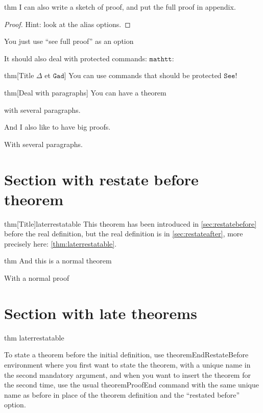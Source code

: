 \documentclass{article}
\begin{document}
\begin{theoremEnd}{thm}
  I can also write a sketch of proof, and put the full proof in appendix.
\end{theoremEnd}
\begin{proof}
  Hint: look at the alias options.
\end{proof}
\begin{proofEnd}
  You just use ``see full proof'' as an option
\end{proofEnd}

It should also deal with protected commands: $\mathtt{mathtt}$:
\begin{theoremEnd}[end]{thm}[Title $\Delta$ et $\mathtt{Gad}$]
  You can use commands that should be protected $\mathtt{See}$!
\end{theoremEnd}

\begin{theoremEnd}[end]{thm}[Deal with paragraphs]
  You can have a theorem

  with several paragraphs.
\end{theoremEnd}
\begin{proofEnd}
  And I also like to have big proofs.
  
  With several paragraphs.
\end{proofEnd}

\section{Section with restate before theorem}\label{sec:restatebefore}

\begin{theoremEndRestateBefore}{thm}[Title]{laterrestatable}
  \label{thm:laterrestatable}
  This theorem has been introduced in \autoref{sec:restatebefore} before the real definition, but the real definition is in \autoref{sec:restateafter}, more precisely here: \autoref{thm:laterrestatable}.
\end{theoremEndRestateBefore}


\begin{theoremEnd}{thm}
  And this is a normal theorem  
\end{theoremEnd}
\begin{proofEnd}
  With a normal proof  
\end{proofEnd}

\section{Section with late theorems}\label{sec:restateafter}
\begin{theoremEnd}{thm}
  laterrestatable
\end{theoremEnd}
\begin{proofEnd}
  To state a theorem before the initial definition, use theoremEndRestateBefore environment where you first want to state the theorem, with a unique name in the second mandatory argument, and when you want to insert the theorem for the second time, use the usual theoremProofEnd command with the same unique name as before in place of the theorem definition and the ``restated before'' option.  
\end{proofEnd}
\end{document}
